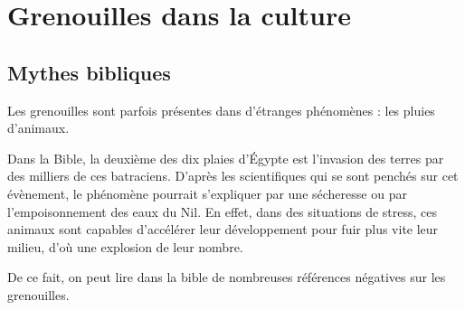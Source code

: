 \section{Grenouilles dans la culture}
\subsection{Mythes bibliques}
Les grenouilles sont parfois présentes dans d'étranges phénomènes : les pluies d'animaux.

Dans la Bible, la deuxième des dix plaies d'Égypte est l'invasion des terres par des milliers de ces batraciens. 
D'après les scientifiques qui se sont penchés sur cet évènement, le phénomène pourrait s'expliquer par une sécheresse ou par l'empoisonnement des eaux du Nil.
 En effet, dans des situations de stress, ces animaux sont capables d'accélérer leur développement pour fuir plus vite leur milieu, d'où une explosion de leur nombre.

De ce fait, on peut lire dans la bible de nombreuses références négatives sur les grenouilles.
